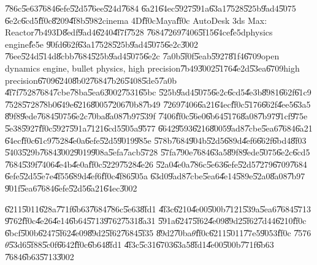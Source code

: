 \documentclass{article}
\begin{document}
\bigskip  

\bigskip \U{786c}\U{5e63}\U{7684}\U{6efe}\U{52d5}\U{76ee}\U{524d}\U{7684}%
\U{6a21}\U{64ec}\U{5927}\U{591a}\U{63a1}\U{7528}\U{525b}\U{9ad4}\U{5075}%
\U{6e2c}\U{6cd5}\U{ff0c}\U{8209}\U{4f8b}\U{5982}cinema 4D\U{ff0c}Maya\U{ff0c}%
AutoDesk 3ds Max: Reactor\U{7b49}3D\U{8edf}\U{9ad4}\U{6240}\U{4f7f}\U{7528}%
\U{7684}\U{7269}\U{7406}\U{5f15}\U{64ce}\U{fe5d}physics engine\U{fe5e}%
\U{90fd}\U{662f}\U{63a1}\U{7528}\U{525b}\U{9ad4}\U{5075}\U{6e2c}\U{3002}%
\U{76ee}\U{524d}\U{514d}\U{8cbb}\U{7684}\U{525b}\U{9ad4}\U{5075}\U{6e2c}%
\U{7a0b}\U{5f0f}\U{5eab}\U{5927}\U{81f4}\U{6709}open dynamics engine, bullet
physics, high precision\U{7b49}\U{3002}\U{5176}\U{4e2d}\U{53ea}\U{6709}high
precision\U{6709}\U{6240}\U{8b02}\U{7684}\U{7b26}\U{5408}\U{5de5}\U{7a0b}%
\U{4f7f}\U{7528}\U{7684}\U{7cbe}\U{78ba}\U{5ea6}\U{3002}\U{7531}\U{65bc}%
\U{525b}\U{9ad4}\U{5075}\U{6e2c}\U{6cd5}\U{4e3b}\U{8981}\U{662f}\U{61c9}%
\U{7528}\U{5728}\U{78b0}\U{649e}\U{6216}\U{8005}\U{7206}\U{70b8}\U{7b49}%
\U{7269}\U{7406}\U{6a21}\U{64ec}\U{ff0c}\U{5176}\U{662f}\U{4ee5}\U{63a5}%
\U{89f8}\U{9ede}\U{7684}\U{5075}\U{6e2c}\U{70ba}\U{8a08}\U{7b97}\U{539f}%
\U{7406}\U{ff0c}\U{56e0}\U{6b64}\U{5176}\U{8a08}\U{7b97}\U{91cf}\U{975e}%
\U{5e38}\U{5927}\U{ff0c}\U{5927}\U{591a}\U{7121}\U{6cd5}\U{505a}\U{9577}%
\U{6642}\U{9593}\U{6216}\U{8005}\U{9ad8}\U{7cbe}\U{5ea6}\U{7684}\U{6a21}%
\U{64ec}\U{ff0c}\U{61c9}\U{7528}\U{4e0a}\U{6efe}\U{52d5}\U{9019}\U{985e}%
\U{578b}\U{7684}\U{904b}\U{52d5}\U{689d}\U{4ef6}\U{662f}\U{6bd4}\U{8f03}%
\U{5403}\U{529b}\U{7684}\U{3002}\U{9019}\U{908a}\U{5efa}\U{7acb}\U{5728}%
\U{57fa}\U{790e}\U{7684}\U{63a5}\U{89f8}\U{9ede}\U{5075}\U{6e2c}\U{6cd5}%
\U{7684}\U{539f}\U{7406}\U{4e4b}\U{4e0a}\U{ff0c}\U{5229}\U{7528}\U{4e26}%
\U{52a0}\U{4e0a}\U{786c}\U{5e63}\U{6efe}\U{52d5}\U{7279}\U{6709}\U{7684}%
\U{6efe}\U{52d5}\U{5e7e}\U{4f55}\U{689d}\U{4ef6}\U{ff0c}\U{4f86}\U{505a}%
\U{63d0}\U{9ad8}\U{7cbe}\U{5ea6}\U{4e14}\U{589e}\U{52a0}\U{8a08}\U{7b97}%
\U{901f}\U{5ea6}\U{7684}\U{6efe}\U{52d5}\U{6a21}\U{64ec}\U{3002}

\U{6211}\U{5011}\U{628a}\U{771f}\U{6b63}\U{7684}\U{786c}\U{5e63}\U{8fd1}%
\U{4f3c}\U{6210}\U{4e00}\U{500b}\U{7121}\U{539a}\U{5ea6}\U{7684}\U{5713}%
\U{9762}\U{ff0c}\U{4e26}\U{4e14}\U{6b64}\U{5713}\U{9762}\U{7531}\U{8a31}%
\U{591a}\U{6247}\U{5f62}\U{4e09}\U{89d2}\U{5f62}\U{7d44}\U{6210}\U{ff0c}%
\U{6bcf}\U{500b}\U{6247}\U{5f62}\U{4e09}\U{89d2}\U{5f62}\U{7684}\U{5f35}%
\U{89d2}\U{70ba}$\theta $\U{ff0c}\U{6211}\U{5011}\U{77e5}\U{9053}\U{ff0c}%
\U{7576}$\theta $\U{53d6}\U{5f88}\U{5c0f}\U{6642}\U{ff0c}\U{6b64}\U{8fd1}%
\U{4f3c}\U{5c31}\U{6703}\U{63a5}\U{8fd1}\U{4e00}\U{500b}\U{771f}\U{6b63}%
\U{7684}\U{6b63}\U{5713}\U{3002}
\end{document}
